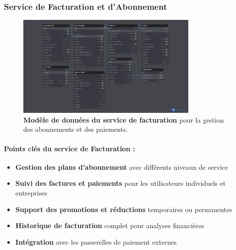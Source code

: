 \subsubsection{Service de Facturation et d'Abonnement}
\begin{figure}[p]
  \centering
  \includegraphics[width=0.8\textwidth,keepaspectratio]{week_1_img/services_db_screanshots/Screenshot 2025-06-06 at 15-05-28 Billing_and_Subscription_Service.pdf.png}
  \caption{\textbf{Modèle de données du service de facturation} pour la gestion des abonnements et des paiements.}
  \label{fig:billing_service}
\end{figure}

\vspace{5pt}
\small
\paragraph{Points clés du service de Facturation :}
\begin{itemize}[leftmargin=*,noitemsep,topsep=0pt]
  \item \textbf{Gestion des plans d'abonnement} avec différents niveaux de service
  \item \textbf{Suivi des factures et paiements} pour les utilisateurs individuels et entreprises
  \item \textbf{Support des promotions et réductions} temporaires ou permanentes
  \item \textbf{Historique de facturation} complet pour analyses financières
  \item \textbf{Intégration} avec les passerelles de paiement externes
\end{itemize}
\normalsize
\clearpage

